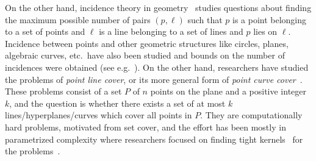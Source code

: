 \documentclass[
final
]{dmtcs-episciences}
\numberwithin{equation}{subsection}
\newcommand{\remove}[1]{}
\begin{document}
On the other hand, incidence theory in geometry~\cite{books/daglib/0018467,books/daglib/0080838} studies questions about finding the maximum possible number of pairs $(p,\ell)$ such that $p$ is a point belonging to a set of points and $\ell$ is a line belonging to a set of lines and $p$ lies on $\ell$. \remove{We will henceforth say that $\ell$ \emph{covers} $p$.} Incidence between points and other geometric structures like circles, planes, algebraic curves, etc.~have also been studied and bounds on the number of incidences were obtained (see e.g.~\cite{books/daglib/0018467,books/daglib/0080838}). On the other hand, researchers have studied the problems of \emph{point line cover}, or its more general form of \emph{point curve cover}~\cite{KratschPR16,BoissonnatDGK18,AfshaniBDN16,LangermanM05}.  These problems consist of a set $P$ of $n$ points on the plane and a positive integer $k$, and the question is whether there exists a set of at most $k$ lines/hyperplanes/curves which cover all points in $P$. They are computationally hard problems, motivated from {\sc set cover}, and the effort has been mostly in parametrized complexity where researchers focused on finding tight kernels~\cite{saketbook15} for the problems~\cite{KratschPR16,BoissonnatDGK18,AfshaniBDN16,LangermanM05}.    
\end{document}
